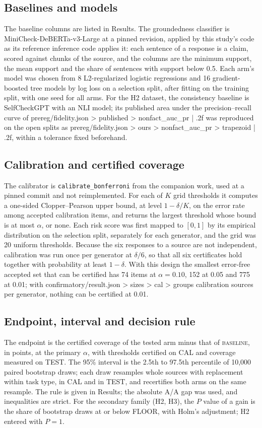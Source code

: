 \documentclass[11pt]{article}
\newcommand{\arm}[1]{\textsc{#1}}
\begin{document}
\subsection*{Baselines and models}
The baseline columns are listed in Results. The groundedness classifier is MiniCheck-DeBERTa-v3-Large\cite{minicheck} at a pinned revision, applied by this study's code as its reference inference code applies it: each sentence of a response is a claim, scored against chunks of the source, and the columns are the minimum support, the mean support and the share of sentences with support below 0.5. Each arm's model was chosen from 8 L2-regularized logistic regressions and 16 gradient-boosted tree models by log loss on a selection split, after fitting on the training split, with one seed for all arms. For the H2 dataset, the consistency baseline is SelfCheckGPT with an NLI model\cite{selfcheck}; its published area under the precision--recall curve of {{prereg/fidelity.json > published > nonfact_auc_pr | .2f}} was reproduced on the open splits as {{prereg/fidelity.json > ours > nonfact_auc_pr > trapezoid | .2f}}, within a tolerance fixed beforehand.

\subsection*{Calibration and certified coverage}
The calibrator is \texttt{calibrate\_bonferroni} from the companion work\cite{mcelveen}, used at a pinned commit and not reimplemented. For each of $K$ grid thresholds it computes a one-sided Clopper--Pearson\cite{clopper} upper bound, at level $1-\delta/K$, on the error rate among accepted calibration items, and returns the largest threshold whose bound is at most $\alpha$, or none. Each risk score was first mapped to $[0,1]$ by its empirical distribution on the selection split, separately for each generator, and the grid was 20 uniform thresholds. Because the six responses to a source are not independent, calibration was run once per generator at $\delta/6$, so that all six certificates hold together with probability at least $1-\delta$. With this design the smallest error-free accepted set that can be certified has 74 items at $\alpha = 0.10$, 152 at 0.05 and 775 at 0.01; with {{confirmatory/result.json > sizes > cal > groups}} calibration sources per generator, nothing can be certified at 0.01.

\subsection*{Endpoint, interval and decision rule}
The endpoint is the certified coverage of the tested arm minus that of \arm{baseline}, in points, at the primary $\alpha$, with thresholds certified on CAL and coverage measured on TEST. The 95\% interval is the 2.5th to 97.5th percentile of 10,000 paired bootstrap draws; each draw resamples whole sources with replacement within task type, in CAL and in TEST, and recertifies both arms on the same resample. The rule is given in Results; the absolute A/A gap was used, and inequalities are strict. For the secondary family (H2, H3), the $P$ value of a gain is the share of bootstrap draws at or below FLOOR, with Holm's adjustment\cite{holm}; H2 entered with $P = 1$.
\end{document}
